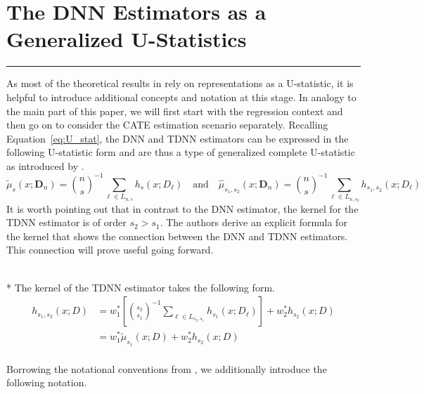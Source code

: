 \section{The DNN Estimators as a Generalized U-Statistics}
\hrule

As most of the theoretical results in \citet{demirkaya_optimal_2024} rely on representations as a U-statistic, it is helpful to introduce additional concepts and notation at this stage.
In analogy to the main part of this paper, we will first start with the regression context and then go on to consider the CATE estimation scenario separately.
Recalling Equation~\ref{eq:U_stat}, the DNN and TDNN estimators can be expressed in the following U-statistic form and are thus a type of generalized complete U-statistic as introduced by \citet{peng_rates_2022}.
\begin{equation}
	\tilde{\mu}_{s}(x; \mathbf{D}_n)
	= \binom{n}{s}^{-1} \sum_{\ell \in L_{n,s}} h_{s}(x; D_{\ell})
	\quad \text{and} \quad
	\hat{\mu}_{s_1, s_2}(x; \mathbf{D}_n)
	= \binom{n}{s}^{-1} \sum_{\ell \in L_{n,s_2}} h_{s_1, s_2}(x; D_{\ell})
\end{equation}
It is worth pointing out that in contrast to the DNN estimator, the kernel for the TDNN estimator is of order $s_2 > s_1$.
The authors derive an explicit formula for the kernel that shows the connection between the DNN and TDNN estimators.
This connection will prove useful going forward.
\begin{boxD}
	\begin{lem}\label{lem:dem8}\mbox{}\\*
		The kernel of the TDNN estimator takes the following form.
		\begin{equation}
			\begin{aligned}
				h_{s_1, s_2}\left(x; D\right)
				 & = w_{1}^{*}\left[\binom{s_2}{s_1}^{-1}\sum_{\ell \in L_{s_2, s_1}} h_{s_1}\left(x; D_{\ell}\right)\right] + w_{2}^{*} h_{s_2}\left(x; D\right) \\
				 & = w_{1}^{*} \tilde{\mu}_{s_1}\left(x; D\right) + w_{2}^{*} h_{s_2}\left(x; D\right)                                                            \\
			\end{aligned}
		\end{equation}
	\end{lem}
\end{boxD}
Borrowing the notational conventions from \citet{lee_u-statistics_2019}, we additionally introduce the following notation.

